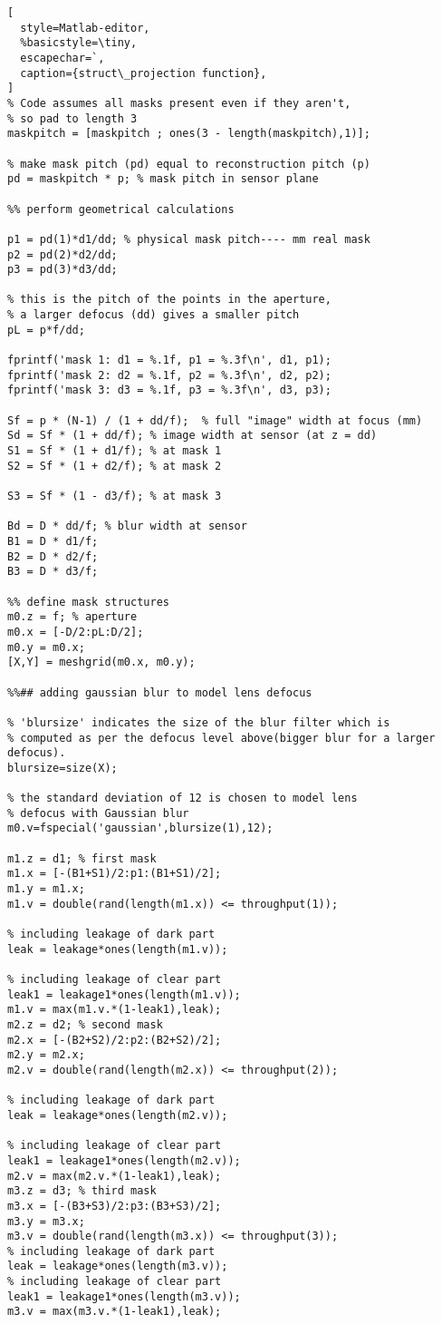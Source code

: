 \begin{lstlisting}[
  style=Matlab-editor,
  %basicstyle=\tiny,
  escapechar=`,
  caption={struct\_projection function},
]
% Code assumes all masks present even if they aren't, 
% so pad to length 3
maskpitch = [maskpitch ; ones(3 - length(maskpitch),1)];

% make mask pitch (pd) equal to reconstruction pitch (p)
pd = maskpitch * p; % mask pitch in sensor plane

%% perform geometrical calculations

p1 = pd(1)*d1/dd; % physical mask pitch---- mm real mask
p2 = pd(2)*d2/dd;
p3 = pd(3)*d3/dd;

% this is the pitch of the points in the aperture,
% a larger defocus (dd) gives a smaller pitch
pL = p*f/dd;  

fprintf('mask 1: d1 = %.1f, p1 = %.3f\n', d1, p1);
fprintf('mask 2: d2 = %.1f, p2 = %.3f\n', d2, p2);
fprintf('mask 3: d3 = %.1f, p3 = %.3f\n', d3, p3);

Sf = p * (N-1) / (1 + dd/f);  % full "image" width at focus (mm)
Sd = Sf * (1 + dd/f); % image width at sensor (at z = dd)
S1 = Sf * (1 + d1/f); % at mask 1
S2 = Sf * (1 + d2/f); % at mask 2 

S3 = Sf * (1 - d3/f); % at mask 3

Bd = D * dd/f; % blur width at sensor
B1 = D * d1/f;
B2 = D * d2/f;
B3 = D * d3/f;

%% define mask structures
m0.z = f; % aperture
m0.x = [-D/2:pL:D/2]; 
m0.y = m0.x;
[X,Y] = meshgrid(m0.x, m0.y);

%%## adding gaussian blur to model lens defocus

% 'blursize' indicates the size of the blur filter which is
% computed as per the defocus level above(bigger blur for a larger defocus).
blursize=size(X);

% the standard deviation of 12 is chosen to model lens 
% defocus with Gaussian blur
m0.v=fspecial('gaussian',blursize(1),12); 

m1.z = d1; % first mask
m1.x = [-(B1+S1)/2:p1:(B1+S1)/2];
m1.y = m1.x;
m1.v = double(rand(length(m1.x)) <= throughput(1));

% including leakage of dark part
leak = leakage*ones(length(m1.v)); 

% including leakage of clear part
leak1 = leakage1*ones(length(m1.v)); 
m1.v = max(m1.v.*(1-leak1),leak);
m2.z = d2; % second mask
m2.x = [-(B2+S2)/2:p2:(B2+S2)/2];
m2.y = m2.x;
m2.v = double(rand(length(m2.x)) <= throughput(2));

% including leakage of dark part
leak = leakage*ones(length(m2.v));

% including leakage of clear part
leak1 = leakage1*ones(length(m2.v));
m2.v = max(m2.v.*(1-leak1),leak);
m3.z = d3; % third mask
m3.x = [-(B3+S3)/2:p3:(B3+S3)/2];
m3.y = m3.x;
m3.v = double(rand(length(m3.x)) <= throughput(3));
% including leakage of dark part
leak = leakage*ones(length(m3.v));
% including leakage of clear part
leak1 = leakage1*ones(length(m3.v));
m3.v = max(m3.v.*(1-leak1),leak);


\end{lstlisting}
